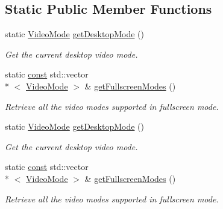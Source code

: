 \subsection*{Static Public Member Functions}
\begin{DoxyCompactItemize}
\item 
static \hyperlink{classsf_1_1_video_mode}{Video\-Mode} \hyperlink{classsf_1_1_video_mode_ac1be160a4342e6eafb2cb0e8c9b18d44}{get\-Desktop\-Mode} ()
\begin{DoxyCompactList}\small\item\em Get the current desktop video mode. \end{DoxyCompactList}\item 
static \hyperlink{term__entry_8h_a57bd63ce7f9a353488880e3de6692d5a}{const} std\-::vector\\*
$<$ \hyperlink{classsf_1_1_video_mode}{Video\-Mode} $>$ \& \hyperlink{classsf_1_1_video_mode_a6815b9b3b35767d5b4563fbed4bfc67b}{get\-Fullscreen\-Modes} ()
\begin{DoxyCompactList}\small\item\em Retrieve all the video modes supported in fullscreen mode. \end{DoxyCompactList}\item 
static \hyperlink{classsf_1_1_video_mode}{Video\-Mode} \hyperlink{classsf_1_1_video_mode_ac1be160a4342e6eafb2cb0e8c9b18d44}{get\-Desktop\-Mode} ()
\begin{DoxyCompactList}\small\item\em Get the current desktop video mode. \end{DoxyCompactList}\item 
static \hyperlink{term__entry_8h_a57bd63ce7f9a353488880e3de6692d5a}{const} std\-::vector\\*
$<$ \hyperlink{classsf_1_1_video_mode}{Video\-Mode} $>$ \& \hyperlink{classsf_1_1_video_mode_a6815b9b3b35767d5b4563fbed4bfc67b}{get\-Fullscreen\-Modes} ()
\begin{DoxyCompactList}\small\item\em Retrieve all the video modes supported in fullscreen mode. \end{DoxyCompactList}\end{DoxyCompactItemize}
